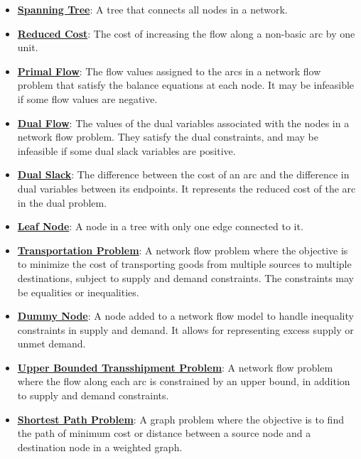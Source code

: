 \documentclass{article}%
\begin{document}
\begin{itemize}[leftmargin=*]
\item \href{https://www.math.purdue.edu/~yipn/421/2024-11-05-NetFlows.pdf#page=10}{\textbf{Spanning Tree}}: A tree that connects all nodes in a network.%
\item \href{https://www.math.purdue.edu/~yipn/421/2024-11-05-NetFlows.pdf#page=22}{\textbf{Reduced Cost}}: The cost of increasing the flow along a non-basic arc by one unit.%
\item \href{https://www.math.purdue.edu/~yipn/421/2024-11-07-NetSimplex.pdf#page=2}{\textbf{Primal Flow}}: The flow values assigned to the arcs in a network flow problem that satisfy the balance equations at each node. It may be infeasible if some flow values are negative.%
\item \href{https://www.math.purdue.edu/~yipn/421/2024-11-07-NetSimplex.pdf#page=3}{\textbf{Dual Flow}}: The values of the dual variables associated with the nodes in a network flow problem. They satisfy the dual constraints, and may be infeasible if some dual slack variables are positive.%
\item \href{https://www.math.purdue.edu/~yipn/421/2024-11-07-NetSimplex.pdf#page=3}{\textbf{Dual Slack}}: The difference between the cost of an arc and the difference in dual variables between its endpoints. It represents the reduced cost of the arc in the dual problem.%
\item \href{https://www.math.purdue.edu/~yipn/421/2024-11-07-NetSimplex.pdf#page=2}{\textbf{Leaf Node}}: A node in a tree with only one edge connected to it.%
\item \href{https://www.math.purdue.edu/~yipn/421/2024-11-14-NetAppls.pdf#page=1}{\textbf{Transportation Problem}}: A network flow problem where the objective is to minimize the cost of transporting goods from multiple sources to multiple destinations, subject to supply and demand constraints. The constraints may be equalities or inequalities.%
\item \href{https://www.math.purdue.edu/~yipn/421/2024-11-14-NetAppls.pdf#page=3}{\textbf{Dummy Node}}: A node added to a network flow model to handle inequality constraints in supply and demand. It allows for representing excess supply or unmet demand.%
\item \href{https://www.math.purdue.edu/~yipn/421/2024-11-14-NetAppls.pdf#page=9}{\textbf{Upper Bounded Transshipment Problem}}: A network flow problem where the flow along each arc is constrained by an upper bound, in addition to supply and demand constraints.%
\item \href{https://www.math.purdue.edu/~yipn/421/2024-11-14-NetAppls.pdf#page=13}{\textbf{Shortest Path Problem}}: A graph problem where the objective is to find the path of minimum cost or distance between a source node and a destination node in a weighted graph.%

\end{itemize}
\end{document}

